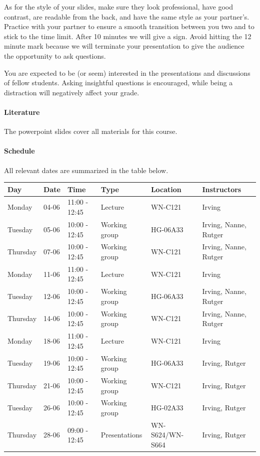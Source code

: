 \documentclass[a4paper]{report}
\begin{document}
As for the style of your slides, make sure they look professional, have good contrast, are readable from the back, and have the same style as your partner’s. Practice with your partner to ensure a smooth transition between you two and to stick to the time limit. After 10 minutes we will give a sign. Avoid hitting the 12 minute mark because we will terminate your presentation to give the audience the opportunity to ask questions.

You are expected to be (or seem) interested in the presentations and discussions of fellow students. Asking insightful questions is encouraged, while being a distraction will negatively affect your grade.

\paragraph{Literature}
The powerpoint slides cover all materials for this course.

\paragraph{Schedule}
All relevant dates are summarized in the table below.

\begin{table}[h!]
	\begin{tabular}{| l | l | l | l | l | l |}
		\hline
		\textbf{Day}	&	\textbf{Date}	& \textbf{Time}	& \textbf{Type}			& \textbf{Location}	& \textbf{Instructors}	\\
		\hline
		Monday			&	04-06			& 11:00 - 12:45	& Lecture				& WN-C121			& Irving				\\
		Tuesday			&	05-06			& 10:00 - 12:45	& Working group			& HG-06A33			& Irving, Nanne, Rutger	\\
		Thursday		&	07-06			& 10:00 - 12:45	& Working group			& WN-C121			& Irving, Nanne, Rutger	\\
		\hline
		Monday			&	11-06			& 11:00 - 12:45	& Lecture				& WN-C121			& Irving				\\
		Tuesday			&	12-06			& 10:00 - 12:45	& Working group			& HG-06A33			& Irving, Nanne, Rutger	\\
		Thursday		&	14-06			& 10:00 - 12:45	& Working group			& WN-C121			& Irving, Nanne, Rutger	\\
		\hline
		Monday			&	18-06			& 11:00 - 12:45	& Lecture				& WN-C121			& Irving				\\
		Tuesday			&	19-06			& 10:00 - 12:45	& Working group			& HG-06A33			& Irving, Rutger	\\
		Thursday		&	21-06			& 10:00 - 12:45	& Working group			& WN-C121			& Irving, Rutger	\\
		\hline
		Tuesday			&	26-06			& 10:00 - 12:45	& Working group			& HG-02A33			& Irving, Rutger	\\
		Thursday		&	28-06			& 09:00 - 12:45	& Presentations			& WN-S624/WN-S664	& Irving, Rutger	\\
		\hline
	\end{tabular}
\end{table}
\end{document}
